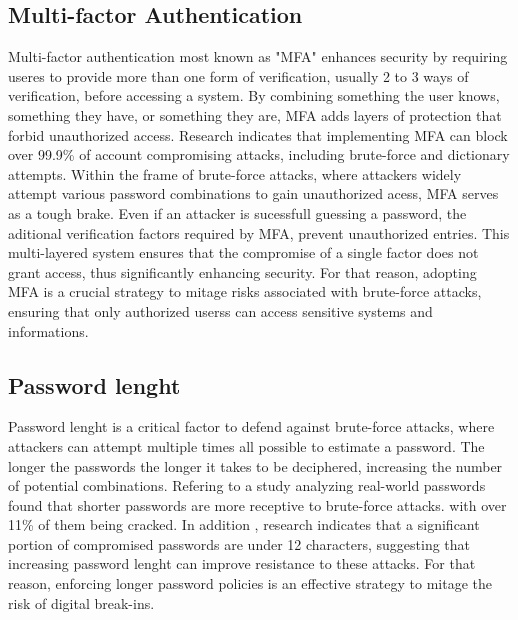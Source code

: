 \documentclass{comjnl}
\begin{document}
\subsection{Multi-factor Authentication}
Multi-factor authentication most known as "MFA" enhances security by requiring useres to provide more than one form of verification, usually 2 to 3 ways of verification, before accessing a system. By combining something the user knows, something they have, or something they are, MFA adds layers of protection that forbid unauthorized access. Research indicates that implementing MFA can block over 99.9\% of account compromising attacks, including brute-force and dictionary attempts.\cite{mfa_effectiveness} Within the frame of brute-force attacks, where attackers widely attempt various password combinations to gain unauthorized acess, MFA serves as a tough brake. Even if an attacker is sucessfull guessing a password, the aditional verification factors required by MFA, prevent unauthorized entries. This multi-layered system ensures that the compromise of a single factor does not grant access, thus significantly enhancing security.\cite{mfa_brute_force} For that reason, adopting MFA is a crucial strategy to mitage risks associated with brute-force attacks, ensuring that only authorized userss can access sensitive systems and informations.

\subsection{Password lenght}
Password lenght is a critical factor to defend against brute-force attacks, where attackers can attempt multiple times all possible to estimate a password. The longer the passwords the longer it takes to be deciphered, increasing the number of potential combinations. Refering to a study analyzing real-world passwords found that shorter passwords are more receptive to brute-force attacks. with over 11\% of them being cracked. \cite{password_lenght} In addition , research indicates that a significant portion of compromised passwords are under 12 characters, suggesting that increasing password lenght can improve resistance to these attacks. \cite{specops} For that reason, enforcing longer password policies is an effective strategy to mitage the risk of digital break-ins. 
\end{document}

